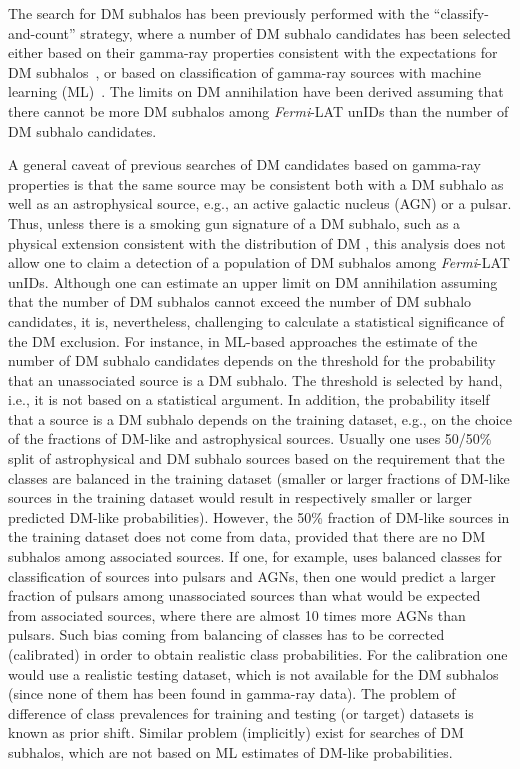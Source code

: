 \documentclass[12pt, a4paper]{article}
\newcommand{\Fermi}{\textsl{Fermi}}
\newcommand{\DMsubhaloML}{\cite{2016ApJ...825...69M,2019JCAP...11..045C,2023JCAP...07..033B,2023MNRAS.520.1348G}}
\newcommand{\DMsubhaloHand}{\cite{2010PhRvD..82f3501B,2012A&A...538A..93Z,2012ApJ...747..121A,2012JCAP...11..050Z,2012PhRvD..86d3504B,2014PhRvD..89a6014B,2015JCAP...12..035B,2016JCAP...05..028S,2017JCAP...04..018H,2017PhRvD..96f3009C,2019JCAP...07..020C,2019JCAP...11..045C}}
\begin{document}
The search for DM subhalos has been previously performed with the ``classify-and-count'' strategy, where a number of DM subhalo candidates has been selected either based on their gamma-ray properties 
consistent with the expectations for DM subhalos~\DMsubhaloHand, or based on classification of gamma-ray sources with machine learning (ML)~\DMsubhaloML.
The limits on DM annihilation have been derived assuming that there cannot be more DM subhalos among \Fermi-LAT unIDs than the number of DM subhalo candidates.

A general caveat of previous searches of DM candidates based on gamma-ray properties is that the same source may be consistent both with a DM subhalo as well as an astrophysical source, e.g., an active galactic nucleus (AGN) or a pulsar.
Thus, unless there is a smoking gun signature of a DM subhalo, such as a physical extension consistent with the distribution of DM 
\cite{2014PhRvD..89a6014B,2015JCAP...12..035B,2017PhRvD..96f3009C,2022PhRvD.105h3006C,2019JCAP...11..045C}, this analysis does not allow one to claim a detection of a population of DM subhalos among \Fermi-LAT unIDs.
Although one can estimate an upper limit on DM annihilation assuming that the number of DM subhalos cannot exceed the number of DM subhalo candidates,
it is, nevertheless, challenging to calculate a statistical significance of the DM exclusion.
For instance, in ML-based approaches the estimate of the number of DM subhalo candidates depends on the threshold for the probability that an unassociated source is a DM subhalo.
The threshold is selected by hand, i.e., it is not based on a statistical argument. In addition, the probability itself that a source is a DM subhalo depends on the training dataset, e.g., on the choice of the fractions of DM-like and astrophysical sources. Usually one uses 50/50\% split of astrophysical and DM subhalo sources based on the requirement that the classes are balanced in the training dataset (smaller or larger fractions of DM-like sources in the training dataset would result in respectively smaller or larger predicted DM-like probabilities). However, the 50\% fraction of DM-like sources in the training dataset does not come from data, provided that there are no DM subhalos among associated sources. If one, for example, uses balanced classes for classification of sources into pulsars and AGNs, then one would predict a larger fraction of pulsars among unassociated sources
than what would be expected from associated sources, where there are almost 10 times more AGNs than pulsars. Such bias coming from balancing of classes has to be corrected (calibrated) in order to obtain realistic class probabilities.
For the calibration one would use a realistic testing dataset, which is not available for the DM subhalos (since none of them has been found in gamma-ray data).
The problem of difference of class prevalences for training and testing (or target) datasets is known as prior shift.
Similar problem (implicitly) exist for searches of DM subhalos, which are not based on ML estimates of DM-like probabilities.
\end{document}
